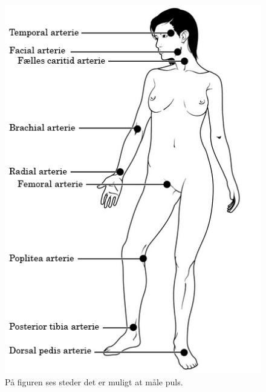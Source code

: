 \begin{figure}[H]
	\centering
	\includegraphics[scale=0.6]{figures/bProblemloesning/puls.png}
	\caption{På figuren ses steder det er muligt at måle puls.\citep{CNX2016}}
	\label{fig:sensor_placering}
	\end{figure}
	


